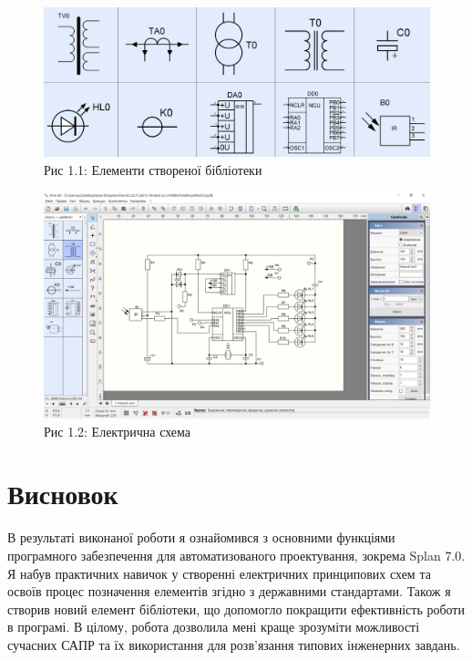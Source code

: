\documentclass[a4paper]{article}
\begin{document}
    \begin{figure}[h]
        \centering
        \includegraphics[width=1\textwidth]{imgs/LW1.1.png}
        \caption*{Рис 1.1: Елементи створеної бібліотеки}
    \end{figure} 

    \newpage 
 
    \begin{figure}[h]
        \centering
        \includegraphics[width=1\textwidth]{imgs/LW1.3.png}
        \caption*{Рис 1.2: Електрична схема}
    \end{figure} 

    \section*{Висновок}
    В результаті виконаної роботи я ознайомився з основними функціями програмного забезпечення 
    для автоматизованого проектування, зокрема Splan 7.0. Я набув практичних навичок у створенні 
    електричних принципових схем та освоїв процес позначення елементів згідно з державними стандартами. 
    Також я створив новий елемент бібліотеки, що допомогло покращити ефективність роботи в програмі. 
    В цілому, робота дозволила мені краще зрозуміти можливості сучасних САПР та їх використання для 
    розв'язання типових інженерних завдань.
\end{document}
